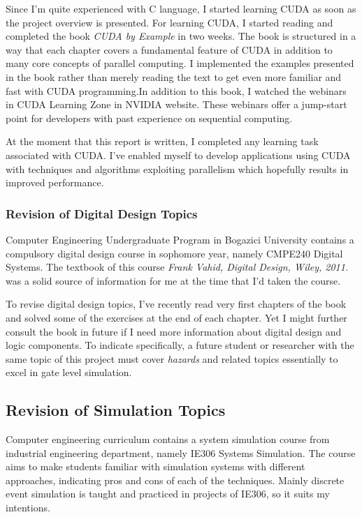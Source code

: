 \documentclass[12pt]{report}
\begin{document}
 Since I'm quite experienced with C language, I started learning CUDA as soon as the project overview is presented. For learning CUDA, I started reading and completed the book \emph{CUDA by Example} in two weeks. The book is structured in a way that each chapter covers a fundamental feature of CUDA in addition to many core concepts of parallel computing. I implemented the examples presented in the book rather than merely reading the text to get even more familiar and fast with CUDA programming.In addition to this book, I watched the webinars in CUDA Learning Zone in NVIDIA website. These webinars offer a jump-start point for developers with past experience on sequential computing.
 
 At the moment that this report is written, I completed any learning task associated with CUDA. I've enabled myself to develop applications using CUDA with techniques and algorithms exploiting parallelism which hopefully results in improved performance. 
 
 \subsubsection{Revision of Digital Design Topics}
 
 Computer Engineering Undergraduate Program in Bogazici University contains a compulsory digital design course in sophomore year, namely CMPE240 Digital Systems. The textbook of this course \emph{Frank Vahid, Digital Design, Wiley, 2011.} was a solid source of information for me at the time that I'd taken the course.
 
 To revise digital design topics, I've recently read very first chapters of the book and solved some of the exercises at the end of each chapter. Yet I might further consult the book in future if I need more information about digital design and logic components. To indicate specifically, a future student or researcher with the same topic of this project must cover \emph{hazards} and related topics essentially to excel in gate level simulation.
 
 \subsection{Revision of Simulation Topics}
 
 Computer engineering curriculum contains a system simulation course from industrial engineering department, namely IE306 Systems Simulation. The course aims to make students familiar with simulation systems with different approaches, indicating pros and cons of each of the techniques. Mainly discrete event simulation is taught and practiced in projects of IE306, so it suits my intentions.
 
\end{document}
